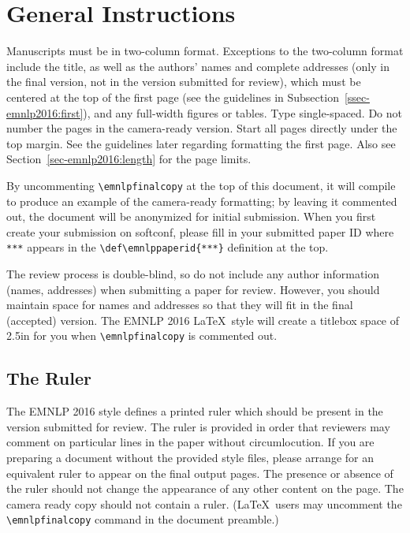 \documentclass[11pt,letterpaper]{article}
\def\emnlppaperid{***}
\begin{document}
\section{General Instructions}

Manuscripts must be in two-column format.  Exceptions to the two-column
format include the title, as well as the authors' names and complete
addresses (only in the final version, not in the version submitted for
review), which must be centered at the top of the first page (see the
guidelines in Subsection~\ref{ssec-emnlp2016:first}), and any full-width figures or
tables.  Type single-spaced.  Do not number the pages in the camera-ready
version. Start all pages directly under the top margin.  See the guidelines
later regarding formatting the first page.  Also see 
Section~\ref{sec-emnlp2016:length} for the page limits.

By uncommenting {\small\verb|\emnlpfinalcopy|} at the top of this document,
it will compile to produce an example of the camera-ready formatting; by
leaving it commented out, the document will be anonymized for initial
submission.  When you first create your submission on softconf, please fill
in your submitted paper ID where {\small\verb|***|} appears in the
{\small\verb|\def\emnlppaperid{***}|} definition at the top.

The review process is double-blind, so do not include any author information
(names, addresses) when submitting a paper for review. However, you should
maintain space for names and addresses so that they will fit in the final
(accepted) version.  The EMNLP 2016 \LaTeX\ style will create a titlebox
space of 2.5in for you when {\small\verb|\emnlpfinalcopy|} is commented out.

\subsection{The Ruler}
The EMNLP 2016 style defines a printed ruler which should be present in the
version submitted for review.  The ruler is provided in order that
reviewers may comment on particular lines in the paper without
circumlocution.  If you are preparing a document without the provided
style files, please arrange for an equivalent ruler to
appear on the final output pages.  The presence or absence of the ruler
should not change the appearance of any other content on the page.  The
camera ready copy should not contain a ruler. (\LaTeX\ users may uncomment
the {\small\verb|\emnlpfinalcopy|} command in the document preamble.)  
\end{document}

